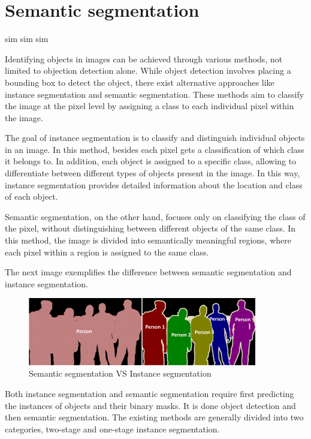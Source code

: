 

\chapter{Semantic segmentation}
\label{chapter:conclusion}

\begin{introduction}
sim sim  sim
\end{introduction}

Identifying objects in images can be achieved through various methods, not limited to objection detection alone. While object detection involves placing a bounding box to detect the object, there exist alternative approaches like instance segmentation and semantic segmentation. These methods aim to classify the image at the pixel level by assigning a class to each individual pixel within the image.

The goal of instance segmentation is to classify and distinguish individual objects in an image. In this method, besides each pixel gets a classification of which class it belongs to. In addition, each object is assigned to a specific class, allowing to differentiate between different types of objects present in the image. In this way, instance segmentation provides detailed information about the location and class of each object.

Semantic segmentation, on the other hand, focuses only on classifying the class of the pixel, without distinguishing between different objects of the same class. In this method, the image is divided into semantically meaningful regions, where each pixel within a region is assigned to the same class.

The next image exemplifies the difference between semantic segmentation and instance segmentation.

\begin{figure}[H]
\centering
\includegraphics[width=10cm]{images/semanticVSinstance.png}
\caption{Semantic segmentation VS Instance segmentation \cite{semanticvsinstance}}
\end{figure}


Both instance segmentation and semantic segmentation require first predicting the instances of objects and their binary masks. It is done object detection and then semantic segmentation. The existing methods are generally divided into two categories\cite{instayolo}, two-stage and one-stage instance segmentation.

